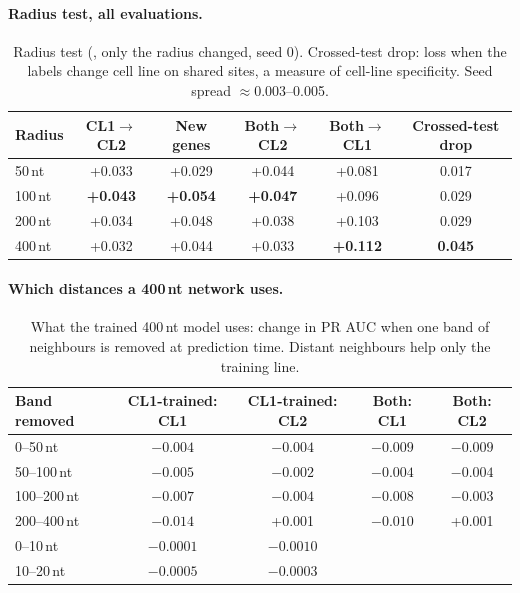 \documentclass[11pt,a4paper]{article}
\newcommand{\mdl}[1]{\texttt{\detokenize{#1}}}
\newcommand{\clone}{CL1}
\newcommand{\cltwo}{CL2}
\begin{document}
\paragraph{Radius test, all evaluations.}
\begin{table}[H]
    \centering\small
    \begin{tabular}{lccccc}
        \toprule
        \textbf{Radius} & \textbf{\clone$\to$\cltwo} & \textbf{New genes} & \textbf{Both$\to$\cltwo} & \textbf{Both$\to$\clone} & \textbf{Crossed-test drop} \\
        \midrule
        50\,nt & +0.033 & +0.029 & +0.044 & +0.081 & 0.017 \\
        100\,nt & \textbf{+0.043} & \textbf{+0.054} & \textbf{+0.047} & +0.096 & 0.029 \\
        200\,nt & +0.034 & +0.048 & +0.038 & +0.103 & 0.029 \\
        400\,nt & +0.032 & +0.044 & +0.033 & \textbf{+0.112} & \textbf{0.045} \\
        \bottomrule
    \end{tabular}
    \caption{Radius test (\mdl{h2gcn_aux}, only the radius changed, seed 0).
    Crossed-test drop: loss when the labels change cell line on shared sites, a measure of cell-line specificity. Seed spread $\approx$0.003--0.005.}
    \label{tab:radius}
\end{table}

\paragraph{Which distances a 400\,nt network uses.}
\begin{table}[H]
    \centering\small
    \begin{tabular}{lcccc}
        \toprule
        \textbf{Band removed} & \textbf{\clone-trained: \clone} & \textbf{\clone-trained: \cltwo} & \textbf{Both: \clone} & \textbf{Both: \cltwo} \\
        \midrule
        0--50\,nt & $-0.004$ & $-0.004$ & $-0.009$ & $-0.009$ \\
        50--100\,nt & $-0.005$ & $-0.002$ & $-0.004$ & $-0.004$ \\
        100--200\,nt & $-0.007$ & $-0.004$ & $-0.008$ & $-0.003$ \\
        200--400\,nt & $-0.014$ & +0.001 & $-0.010$ & +0.001 \\
        0--10\,nt & $-0.0001$ & $-0.0010$ & & \\
        10--20\,nt & $-0.0005$ & $-0.0003$ & & \\
        \bottomrule
    \end{tabular}
    \caption{What the trained 400\,nt model uses: change in PR AUC when one
    band of neighbours is removed at prediction time. Distant neighbours help
    only the training line.}
    \label{tab:bands}
\end{table}
\end{document}
